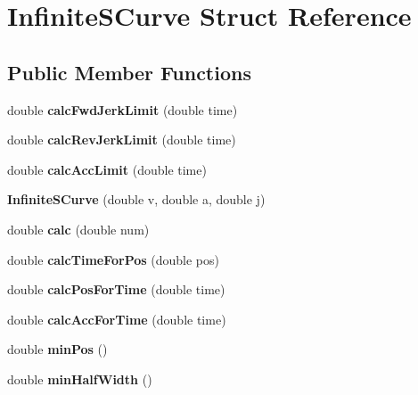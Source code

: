 \hypertarget{structInfiniteSCurve}{}\section{Infinite\+S\+Curve Struct Reference}
\label{structInfiniteSCurve}
\subsection*{Public Member Functions}
\begin{DoxyCompactItemize}
\item 
\mbox{\label{structInfiniteSCurve_aceefa8b485ba846876810080694c8161}} 
double {\bfseries calc\+Fwd\+Jerk\+Limit} (double time)
\item 
\mbox{\label{structInfiniteSCurve_a8741f0b3363ec756bb5e1354241ae547}} 
double {\bfseries calc\+Rev\+Jerk\+Limit} (double time)
\item 
\mbox{\label{structInfiniteSCurve_a351be64405faf57e20810a59f0ee2a10}} 
double {\bfseries calc\+Acc\+Limit} (double time)
\item 
\mbox{\label{structInfiniteSCurve_abdc923945779b11a417ced169c9d79aa}} 
{\bfseries Infinite\+S\+Curve} (double v, double a, double j)
\item 
\mbox{\label{structInfiniteSCurve_a224dd310c22430f53bae464479449b0c}} 
double {\bfseries calc} (double num)
\item 
\mbox{\label{structInfiniteSCurve_a1d0d395b4f5ed515c6e62b91c837dafa}} 
double {\bfseries calc\+Time\+For\+Pos} (double pos)
\item 
\mbox{\label{structInfiniteSCurve_a109574e9697b2ce83961889898f6425e}} 
double {\bfseries calc\+Pos\+For\+Time} (double time)
\item 
\mbox{\label{structInfiniteSCurve_a6525ffc67eb4568b9a27d9555172a973}} 
double {\bfseries calc\+Acc\+For\+Time} (double time)
\item 
\mbox{\label{structInfiniteSCurve_a1b295c1675d6295a13badbd0e39dfc58}} 
double {\bfseries min\+Pos} ()
\item 
\mbox{\label{structInfiniteSCurve_a03647e0572ea4399038316e85e0e9eab}} 
double {\bfseries min\+Half\+Width} ()
\end{DoxyCompactItemize}
